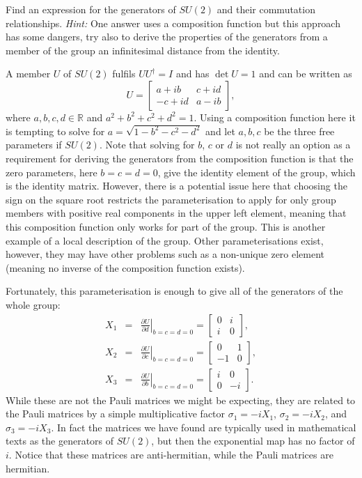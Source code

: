 \documentclass[notes.tex]{subfiles}
\begin{document}
\begin{Exercise}[difficulty={3},label=ex:SU2_generators]
Find an expression for the generators of $SU(2)$ and their commutation relationships. {\it Hint:} One answer uses a composition function but this approach has some dangers, try also to derive the properties of the generators from a member of the group an infinitesimal distance from the identity.
\end{Exercise}
\begin{Answer}
A member $U$ of $SU(2)$ fulfils $UU^\dagger=I$ and has $\det U =1$ and can be written as 
\[U=\left[\begin{matrix} a+ib & c+id \\ -c+id &  a-ib \end{matrix}\right],\] 
where $a,b,c,d\in\mathbb R$ and $a^2+b^2+c^2+d^2=1$. Using a composition function here it is tempting to solve for $a=\sqrt{1-b^2-c^2-d^2}$ and let $a,b,c$ be the three free parameters if $SU(2)$. Note that solving for $b$, $c$ or $d$ is not really an option as a requirement for deriving the generators from the composition function is that the zero parameters, here $b=c=d=0$, give the identity element of the group, which is the identity matrix. However, there is a potential issue here that choosing the sign on the square root restricts the parameterisation to apply for only group members with positive real components in the upper left element, meaning that this composition function only works for part of the group. This is another example of a local description of the group.  Other parameterisations exist, however, they may have other problems such as a non-unique zero element (meaning no inverse of the composition function exists).

Fortunately, this parameterisation is enough to give all of the generators of the whole group:
\begin{eqnarray*} 
X_1&=&\left.\frac{\partial U}{\partial  d}\right|_{b=c=d=0}=\left[\begin{matrix} 0 & i \\ i & 0 \end{matrix}\right], \\
X_2&=&\left.\frac{\partial U}{\partial  c}\right|_{b=c=d=0}=\left[\begin{matrix} 0 & 1 \\ -1 & 0 \end{matrix}\right], \\
X_3&=&\left.\frac{\partial U}{\partial  b}\right|_{b=c=d=0}=\left[\begin{matrix} i & 0 \\ 0 & -i \end{matrix}\right].
\end{eqnarray*} 
While these are not the Pauli matrices we might be expecting, they are related to the Pauli matrices by a simple multiplicative factor $\sigma_1=-iX_1$,  $\sigma_2=-iX_2$,  and $\sigma_3=-iX_3$. In fact the matrices we have found are typically used in mathematical texts as the generators of $SU(2)$, but then the exponential map has no factor of $i$. Notice that these matrices are anti-hermitian, while the Pauli matrices are hermitian.


\end{Answer}
\end{document}
